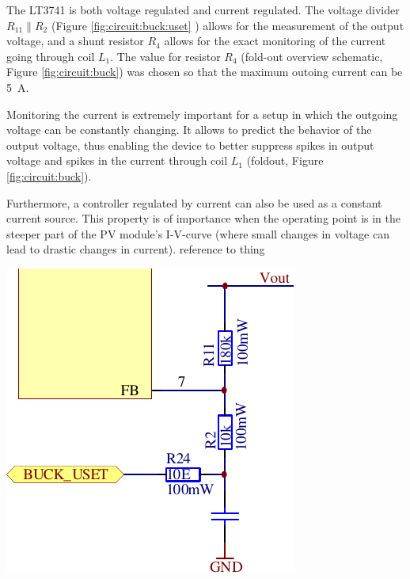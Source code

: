 \begin{minipage}{0.5\textwidth}
    The LT3741  is both voltage  regulated and current  regulated. The voltage
    divider  $R_{11}  \parallel  R_2$  (Figure  \ref{fig:circuit:buck:uset}  )
    allows for  the measurement of  the output  voltage, and a  shunt resistor
    $R_4$ allows  for the exact monitoring  of the current going  through coil
    $L_1$. The value  for resistor $R_4$ (fold-out  overview schematic, Figure
    \ref{fig:circuit:buck}) was chosen so that the maximum outoing current can
    be \SI{5}{\ampere}.

    Monitoring the  current is extremely  important for  a setup in  which the
    outgoing  voltage can  be constantly  changing. It allows  to predict  the
    behavior  of  the output  voltage,  thus  enabling  the device  to  better
    suppress spikes in  output voltage and spikes in the  current through coil
    $L_1$ (foldout, Figure \ref{fig:circuit:buck}).

    Furthermore,  a controller  regulated by  current can  also be  used as  a
    constant current source. This property is of importance when the operating
    point is  in the steeper  part of the  PV module's I-V-curve  (where small
    changes  in  voltage  can  lead to  drastic  changes  in  current). %
    reference to thing

\end{minipage}
\begin{minipage}{0.5\textwidth}
    \center
    \includegraphics[width=.85\textwidth]{images/circuit/buck-uset.pdf}
    \label{fig:circuit:buck:uset}
\end{minipage}

